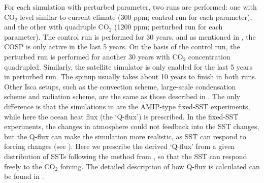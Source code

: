 For each simulation with perturbed parameter, two runs are performed: one with CO$_2$ level similar to current climate (300 ppm; control run for each parameter), and the other with quadruple CO$_2$ (1200 ppm; perturbed run for each parameter). The control run is performed for 30 years, and as mentioned in , the COSP is only active in the last 5 years. On the basis of the control run, the perturbed run is performed for another 30 years with CO$_2$ concentration quadrupled. Similarly, the satellite simulator is only enabled for the last 5 years in perturbed run. The spinup usually takes about 10 years to finish in both runs. Other Isca setups, such as the convection scheme, large-scale condensation scheme and radiation scheme, are the same as those described in . The only difference is that the simulations in  are the AMIP-type fixed-SST experiments, while here the ocean heat flux (the `Q-flux') is prescribed. In the fixed-SST experiments, the changes in atmosphere could not feedback into the SST changes, but the Q-flux can make the simulation more realistic, as SST can respond to forcing changes (see ). Here we prescribe the derived `Q-flux' from a given distribution of SSTs \citep{Durack2018} following the method from \cite{Russell1985}, so that the SST can respond freely to the CO$_2$ forcing. The detailed description of how Q-flux is calculated can be found in .

